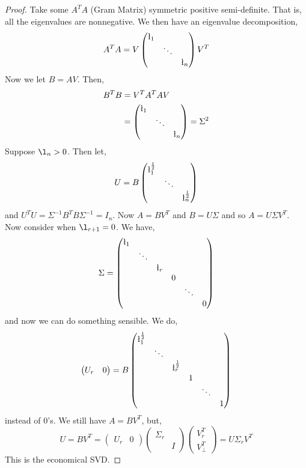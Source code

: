 \begin{proof}
  Take some $A^TA$ (Gram Matrix) symmetric positive semi-definite. That is, all the eigenvalues are nonnegative. We then have an eigenvalue decomposition,
  $$ A^TA = V\begin{pmatrix}
    \l_1 && \\
    & \ddots & \\
    && \l_n
  \end{pmatrix}V^T $$
Now we let $B = AV$. Then,
\begin{align*}
  B^TB &= V^T A^T A V\\
  &= \begin{pmatrix}
    \l_1 && \\
    & \ddots & \\
    && \l_n
  \end{pmatrix} = \Sigma^2
\end{align*}
Suppose $\l_n > 0$. Then let,
$$ U = B \begin{pmatrix}
  \l_1^{\frac{1}{2}} && \\
  & \ddots & \\
  && \l_n^{\frac{1}{2}}
\end{pmatrix} $$
and $U^TU = \Sigma^{-1} B^T B \Sigma^{-1} = I_n$. Now $A = BV^T$ and $B = U\Sigma$ and so $A = U\Sigma V^T$.
Now consider when $\l_{r+1} = 0$. We have,
$$ \Sigma = \begin{pmatrix}
  \l_1 &&&&& \\
  & \ddots &&&& \\
  && \l_r &&& \\
  &&& 0 && \\
  &&&& \ddots & \\
  &&&&& 0
\end{pmatrix} $$
and now we can do something sensible. We do,
$$ \begin{pmatrix}
  U_r & 0
\end{pmatrix} =  B \begin{pmatrix}
  \l_1^{\frac{1}{2}} &&&&& \\
  & \ddots &&&& \\
  && \l_r^{\frac{1}{2}} &&& \\
  &&& 1 && \\
  &&&& \ddots & \\
  &&&&& 1
\end{pmatrix} $$
instead of 0's. We still have $A = BV^T$, but,
$$ U = BV^T = \begin{pmatrix}
  U_r & 0
\end{pmatrix} \begin{pmatrix}
  \Sigma_r & \\ & I
\end{pmatrix}\begin{pmatrix}
   V_r^T \\ V_\bot^T
\end{pmatrix} = U\Sigma_r V^T $$
This is the economical SVD.
\end{proof}

